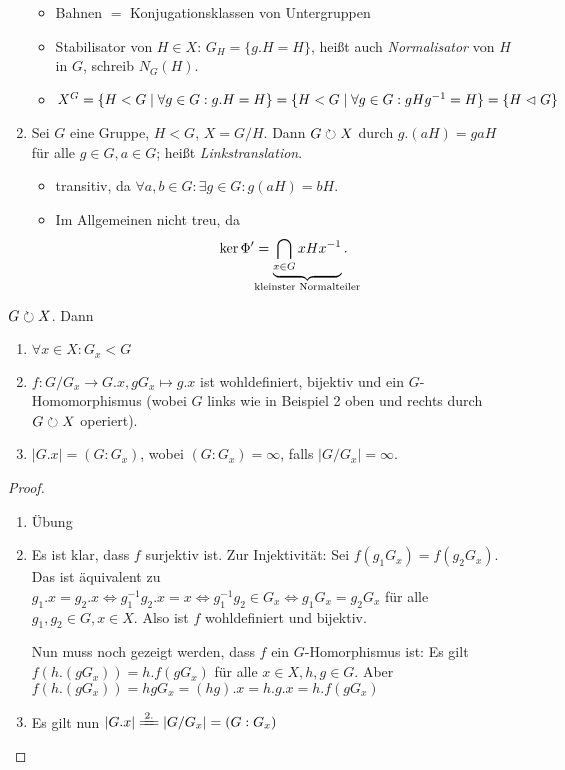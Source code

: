 \documentclass[12pt,a4paper]{scrartcl}
\begin{document}
\begin{bsp}
\begin{enumerate}
		\begin{itemize}[itemsep=-3pt]
			\item Bahnen $=$ Konjugationsklassen von Untergruppen
			\item Stabilisator von $H\in X$: $G_H = \{ g.H = H \}$, heißt auch \emph{Normalisator} von $H$ in $G$, schreib $N_G(H)$.
			\item $X^G = \{ H < G \mid \forall g \in G: g.H = H \}=\{ H < G \mid \forall g \in G: gHg^{-1} = H \} = \{H \vartriangleleft G \}$
		\end{itemize}
		\item Sei $G$ eine Gruppe, $H < G$, $X = G/H$. Dann $G \circlearrowright X$ durch $g.(aH) = gaH$ für alle $g\in G, a \in G$; heißt \emph{Linkstranslation}. \label{bsp:linkstrans}
		\begin{itemize}[itemsep=-3pt]
			\item transitiv, da $\forall a,b \in G: \exists g \in G: g(aH)=bH$.
			\item Im Allgemeinen nicht treu, da \[\ker\Phi' = \underbrace{\bigcap_{x \in G}xHx^{-1}}_{\mathclap{\text{kleinster Normalteiler}}}.\]
		\end{itemize}
	\end{enumerate}
\end{bsp}

\begin{lem}
	$G\circlearrowright X$. Dann
	\begin{enumerate}
		\item $\forall x\in X: G_x<G$
		\item $f\colon G/G_x\to G.x, gG_x\mapsto g.x$ ist wohldefiniert, bijektiv und ein $G$-Homomorphismus \textup(wobei $G$ links wie in Beispiel 2 oben und rechts durch $G\circlearrowright X$ operiert\textup).
		\item $|G.x| = (G:G_x)$, wobei $(G:G_x) = \infty$, falls $|G/G_x |=\infty$.
	\end{enumerate}
\end{lem}

\begin{proof}
	\leavevmode
	\begin{enumerate}
		\item Übung
		\item Es ist klar, dass $f$ surjektiv ist. Zur Injektivität: Sei $f(g_1G_x) = f(g_2G_x)$. Das ist äquivalent zu $ g_1.x = g_2.x\Leftrightarrow g_1^{-1}g_2.x = x \Leftrightarrow g_1^{-1}g_2\in G_x \Leftrightarrow g_1G_x = g_2G_x$ für alle $g_1,g_2 \in G, x\in X$. Also ist $f$ wohldefiniert und bijektiv.
		
		Nun muss noch gezeigt werden, dass $f$ ein $G$-Homorphismus ist: Es gilt $f(h.(gG_x)) = h.f(gG_x)$ für alle $x\in X, h,g\in G$. Aber $f(h.(gG_x)) = hgG_x = (hg).x = h.g.x = h.f(gG_x)$
		\item Es gilt nun $|G.x|\xeq{2.} |G/G_x| = (G:G_x)$
  \qedhere
	\end{enumerate}
\end{proof}
\end{document}
